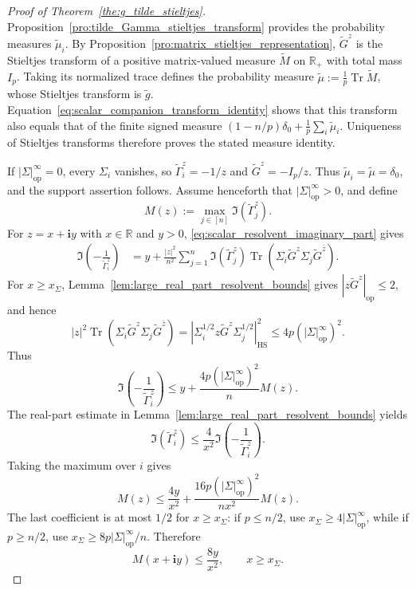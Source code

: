 \documentclass[EJP, preprint, NODS, nobera, nofontexpansion]{ejpecp}
\newcommand{\ii}{\mathbf{i}}
\DeclareMathOperator{\op}{op}
\DeclareMathOperator{\tr}{Tr}
\DeclareMathOperator{\hs}{HS}
\begin{document}
\begin{proof}[Proof of Theorem~\ref{the:g_tilde_stieltjes}]
Proposition~\ref{pro:tilde_Gamma_stieltjes_transform} provides the
probability measures \(\tilde\mu_i\). By
Proposition~\ref{pro:matrix_stieltjes_representation}, \(\tilde G^z\) is
the Stieltjes transform of a positive matrix-valued measure
\(\tilde M\) on \(\mathbb R_+\) with total mass \(I_p\).
Taking its normalized trace defines the probability measure
\(\tilde\mu:=\frac1p\tr\tilde M\), whose Stieltjes transform is
\(\tilde g\). Equation~\eqref{eq:scalar_companion_transform_identity}
shows that this transform also equals that of the finite signed measure
\((1-n/p)\delta_0+\frac1p\sum_i\tilde\mu_i\).
Uniqueness of Stieltjes transforms therefore proves the stated measure
identity.

If \(|\Sigma|_{\op}^\infty=0\), every \(\Sigma_i\) vanishes, so
\(\tilde\Gamma_i^z=-1/z\) and \(\tilde G^z=-I_p/z\). Thus
\(\tilde\mu_i=\tilde\mu=\delta_0\), and the support assertion follows.
Assume henceforth that \(|\Sigma|_{\op}^\infty>0\), and define
\[
    M(z):=\max_{j\in[n]}\Im(\tilde\Gamma_j^z).
\]
For \(z=x+\ii y\) with \(x\in\mathbb R\) and \(y>0\),
\eqref{eq:scalar_resolvent_imaginary_part} gives
\begin{align}
    \Im\left(-\frac1{\tilde\Gamma_i^z}\right)
    &=
    y+\frac{|z|^2}{n^2}\sum_{j=1}^n
    \Im(\tilde\Gamma_j^z)
    \tr\!\left(
        \Sigma_i\tilde G^z
        \Sigma_j\tilde G^{\bar z}
    \right).
\end{align}
For \(x\geq x_\Sigma\),
Lemma~\ref{lem:large_real_part_resolvent_bounds} gives
\(|z\tilde G^z|_{\op}\leq2\), and hence
\[
    |z|^2\tr\!\left(
        \Sigma_i\tilde G^z
        \Sigma_j\tilde G^{\bar z}
    \right)
    =
    \left|
        \Sigma_i^{1/2}z\tilde G^z\Sigma_j^{1/2}
    \right|_{\hs}^{2}
    \leq4p(|\Sigma|_{\op}^\infty)^2.
\]
Thus
\[
    \Im\left(-\frac1{\tilde\Gamma_i^z}\right)
    \leq
    y+\frac{4p(|\Sigma|_{\op}^\infty)^2}{n}M(z).
\]
The real-part estimate in
Lemma~\ref{lem:large_real_part_resolvent_bounds} yields
\[
    \Im(\tilde\Gamma_i^z)
    \leq
    \frac4{x^2}
    \Im\left(-\frac1{\tilde\Gamma_i^z}\right).
\]
Taking the maximum over \(i\) gives
\[
    M(z)
    \leq
    \frac{4y}{x^2}
    +
    \frac{16p(|\Sigma|_{\op}^\infty)^2}{nx^2}M(z).
\]
The last coefficient is at most \(1/2\) for
\(x\geq x_\Sigma\): if \(p\leq n/2\), use
\(x_\Sigma\geq4|\Sigma|_{\op}^\infty\), while if \(p\geq n/2\), use
\(x_\Sigma\geq8p|\Sigma|_{\op}^\infty/n\).  Therefore
\[
    M(x+\ii y)\leq\frac{8y}{x^2},
    \qquad x\geq x_\Sigma.
\]


\end{proof}
\end{document}

